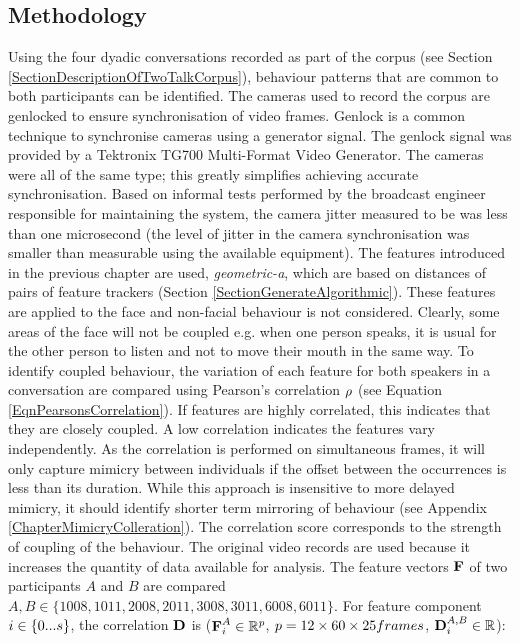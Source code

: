 \subsection{Methodology}

Using the four dyadic conversations recorded as part of the corpus (see Section \ref{SectionDescriptionOfTwoTalkCorpus}), behaviour patterns that are common to both participants can be identified. The cameras used to record the corpus are genlocked to ensure synchronisation of video frames. Genlock is a common technique to synchronise cameras using a generator signal. The genlock signal was provided by a Tektronix TG700 Multi-Format Video Generator. The cameras were all of the same type; this greatly simplifies achieving accurate synchronisation. Based on informal tests performed by the broadcast engineer responsible for maintaining the system, the camera jitter measured to be was less than one microsecond (the level of jitter in the camera synchronisation was smaller than measurable using the available equipment). The features introduced in the previous chapter are used, \textit{geometric-a}, which are based on distances of pairs of feature trackers (Section \ref{SectionGenerateAlgorithmic}). These features are applied to the face and non-facial behaviour is not considered. %
Clearly, some areas of the face will not be coupled e.g. when one person speaks, it is usual for the other person to listen and not to move their mouth in the same way. To identify coupled behaviour, the variation of each feature for both speakers in a conversation are compared using Pearson's correlation $\rho$ (see Equation \ref{EqnPearsonsCorrelation}). If features are highly correlated, this indicates that they are closely coupled. A low correlation indicates the features vary independently. As the correlation is performed on simultaneous frames, it will only capture mimicry between individuals if the offset between the occurrences is less than its duration. While this approach is insensitive to more delayed mimicry, it should identify shorter term mirroring of behaviour (see Appendix \ref{ChapterMimicryColleration}). The correlation score corresponds to the strength of coupling of the behaviour. The original video records are used because it increases the quantity of data available for analysis. The feature vectors $\textbf{F}$ of two participants $A$ and $B$ are compared $A, B \in \{1008, 1011, 2008, 2011, 3008, 3011, 6008, 6011\}$. For feature component $i \in \{0...s\}$, the correlation $\textbf{D}$ is ($\textbf{F}^A_i \in \mathbb{R}^{p}$, $p = 12 \times 60 \times 25 frames$, $\textbf{D}^{A,B}_i \in \mathbb{R}$):

